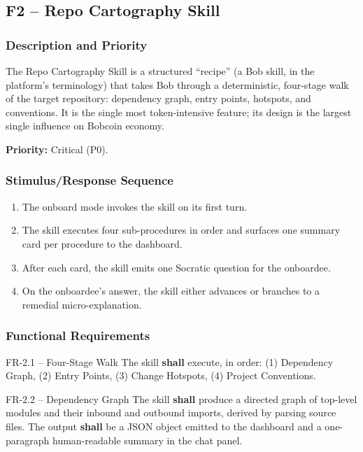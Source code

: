 \documentclass[11pt,letterpaper]{article}
\newcommand{\shall}{\textbf{shall}}
\begin{document}
\subsection{F2 -- Repo Cartography Skill}

\subsubsection{Description and Priority}

The Repo Cartography Skill is a structured ``recipe'' (a Bob skill, in the platform's terminology) that takes Bob through a deterministic, four-stage walk of the target repository: dependency graph, entry points, hotspots, and conventions. It is the single most token-intensive feature; its design is the largest single influence on Bobcoin economy.

\textbf{Priority:} Critical (P0).

\subsubsection{Stimulus/Response Sequence}

\begin{enumerate}
  \item The onboard mode invokes the skill on its first turn.
  \item The skill executes four sub-procedures in order and surfaces one summary card per procedure to the dashboard.
  \item After each card, the skill emits one Socratic question for the onboardee.
  \item On the onboardee's answer, the skill either advances or branches to a remedial micro-explanation.
\end{enumerate}

\subsubsection{Functional Requirements}

\begin{reqbox}{FR-2.1 -- Four-Stage Walk}
The skill \shall{} execute, in order: (1) Dependency Graph, (2) Entry Points, (3) Change Hotspots, (4) Project Conventions.
\end{reqbox}

\begin{reqbox}{FR-2.2 -- Dependency Graph}
The skill \shall{} produce a directed graph of top-level modules and their inbound and outbound imports, derived by parsing source files. The output \shall{} be a JSON object emitted to the dashboard and a one-paragraph human-readable summary in the chat panel.
\end{reqbox}
\end{document}

